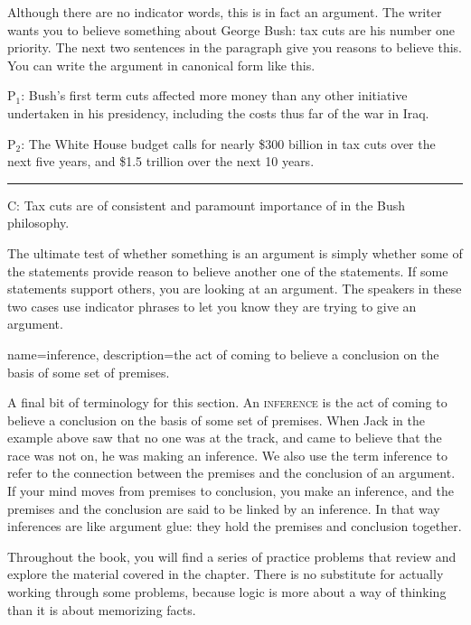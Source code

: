 Although there are no indicator words, this is in fact an argument. The writer wants you to believe something about George Bush: tax cuts are his number one priority. The next two sentences in the paragraph give you reasons to believe this. You can write the argument in canonical form like this.

\begin{earg}
\item[P$_1$:] Bush's first term cuts affected more money than any other initiative undertaken in his presidency, including the costs thus far of the war in Iraq. 
\item[P$_2$:] The White House budget calls for nearly \$300 billion in tax cuts over the next five years, and \$1.5 trillion over the next 10 years. 
\vspace{-.5em}
\item [] \rule{0.9\linewidth}{.5pt} 
\item[C:] Tax cuts are of consistent and paramount importance of in the Bush philosophy.
\end{earg} 

The ultimate test of whether something is an argument is simply whether some of the statements provide reason to believe another one of the statements. If some statements support others, you are looking at an argument. The speakers in these two cases use indicator phrases to let you know they are trying to give an argument.

{
name=inference,
description={the act of coming to believe a conclusion on the basis of some set of premises.}
}

A final bit of terminology for this section. An \textsc{\gls{inference}} \label{def:Inference} is the act of coming to believe a conclusion on the basis of some set of premises. When Jack in the example above saw that no one was at the track, and came to believe that the race was not on, he was making an inference. We also use the term inference to refer to the connection between the premises and the conclusion of an argument. If your mind moves from premises to conclusion, you make an inference, and the premises and the conclusion are said to be linked by an inference. In that way inferences are like argument glue: they hold the premises and conclusion together. 



\practiceproblems
Throughout the book, you will find a series of practice problems that review and explore the material covered in the chapter. There is no substitute for actually working through some problems, because logic is more about a way of thinking than it is about memorizing facts. %

